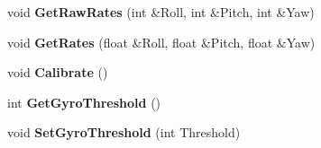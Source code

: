 \begin{DoxyCompactItemize}
\item 
\hypertarget{class_c_gyroscope_ab8d7db3bf44a8686d91e8fae5824af97}{void {\bfseries Get\-Raw\-Rates} (int \&Roll, int \&Pitch, int \&Yaw)}\label{class_c_gyroscope_ab8d7db3bf44a8686d91e8fae5824af97}

\item 
\hypertarget{class_c_gyroscope_a96b2a55ace21483305ef3f64bf415092}{void {\bfseries Get\-Rates} (float \&Roll, float \&Pitch, float \&Yaw)}\label{class_c_gyroscope_a96b2a55ace21483305ef3f64bf415092}

\item 
\hypertarget{class_c_gyroscope_a690a6e901390f2b57d0e48c03d00bc0f}{void {\bfseries Calibrate} ()}\label{class_c_gyroscope_a690a6e901390f2b57d0e48c03d00bc0f}

\item 
\hypertarget{class_c_gyroscope_a36ee104d7a2304c3b414cf48910c9fcb}{int {\bfseries Get\-Gyro\-Threshold} ()}\label{class_c_gyroscope_a36ee104d7a2304c3b414cf48910c9fcb}

\item 
\hypertarget{class_c_gyroscope_ace5399f8d1305a5ac8391fdaee52e32d}{void {\bfseries Set\-Gyro\-Threshold} (int Threshold)}\label{class_c_gyroscope_ace5399f8d1305a5ac8391fdaee52e32d}

\end{DoxyCompactItemize}
